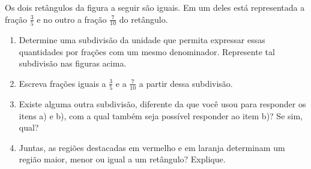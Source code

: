 \begin{atividade}{}

Os dois retângulos da figura a seguir são iguais. 
Em um deles está representada a fração $\frac{3}{5}$ e no outro a fração $\frac{7}{10}$ do retângulo.

\begin{center}
\end{center}

\begin{enumerate} [\quad a)] %
  \item     Determine uma subdivisão da unidade que permita expressar essas quantidades por frações com um mesmo denominador. Represente tal subdivisão nas figuras acima.
  \item     Escreva frações iguais a     $\frac{3}{5}$     e a     $\frac{7}{10}$     a partir dessa subdivisão.
  \item     Existe alguma outra subdivisão, diferente da que você usou para responder os itens a) e b), com a qual também seja possível responder ao item b)? Se sim, qual?
  \item     Juntas, as regiões destacadas em vermelho e em laranja determinam um região maior, menor ou igual a um retângulo? Explique.
\end{enumerate} %
\end{atividade}

